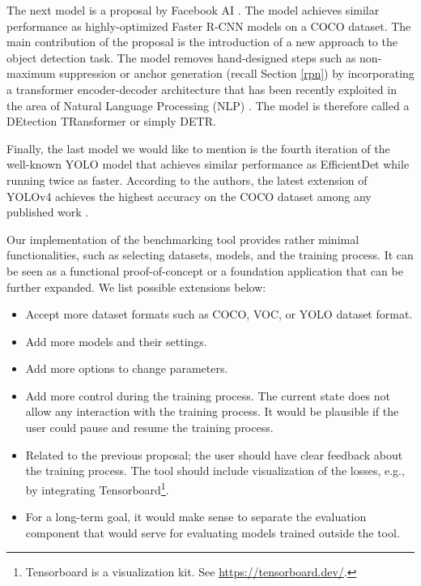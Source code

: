 The next model is a proposal by Facebook AI \cite{detr}. The model achieves similar
performance as highly-optimized Faster R-CNN models on a COCO dataset. The main
contribution of the proposal is the introduction of a new approach to the object
detection task. The model removes hand-designed steps such as non-maximum
suppression or anchor generation (recall Section \ref{rpn}) by incorporating a
transformer encoder-decoder architecture \cite{transformer} that has been
recently exploited in the area of Natural Language Processing (NLP)
\cite{bert, gpt3}. The model is therefore called a DEtection TRansformer or
simply DETR.

Finally, the last model we would like to mention is the fourth iteration of the
well-known YOLO model \cite{yolo1, yolo2, yolo3, yolo4} that achieves similar
performance as EfficientDet while running twice as faster. According to the
authors, the latest extension of YOLOv4 achieves the highest accuracy on the
COCO dataset among any published work \cite{yolo4scaled}.

Our implementation of the benchmarking tool provides rather minimal
functionalities, such as selecting datasets, models, and the training process.
It can be seen as a functional proof-of-concept or a foundation application that
can be further expanded. We list possible extensions below:
\begin{itemize}
    \item Accept more dataset formats such as COCO, VOC, or YOLO dataset format.
    \item Add more models and their settings.
    \item Add more options to change parameters.
    \item Add more control during the training process. The current state does
          not allow any interaction with the training process. It would be
          plausible if the user could pause and resume the training process.
    \item Related to the previous proposal; the user should have clear feedback
          about the training process. The tool should include visualization of
          the losses, e.g., by integrating Tensorboard\footnote{
              Tensorboard is a visualization kit. See
              \url{https://tensorboard.dev/}.
          }.
    \item For a long-term goal, it would make sense to separate the evaluation
          component that would serve for evaluating models trained outside the
          tool.
\end{itemize}